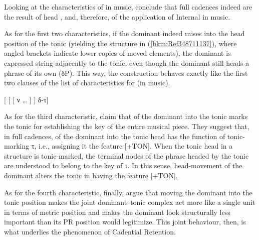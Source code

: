 \documentclass[output=paper]{langsci/langscibook}
\begin{document}
Looking at the characteristics of  in music,
\citeauthor{KatzPes2011} conclude that full cadences indeed are the result of
head , and, therefore, of the application of Internal  in
music.

As for the first two characteristics, if the dominant indeed raises into the
head position of the tonic (yielding the structure in (\ref{bkm:Ref348711137}),
where angled brackets indicate lower copies of moved elements), the dominant is
expressed string-adjacently to the tonic, even though the dominant still heads
a phrase of its own (δP). This way, the construction behaves exactly like the
first two clauses of the list of characteristics for  (in music).

\ea\label{bkm:Ref348711137}
    {}[ [ [ ν \dots{} ]  ] δ-τ]
\z

As for the third characteristic, \citeauthor{KatzPes2011} claim that 
of the dominant into the tonic marks the tonic for establishing the key of the
entire musical piece. They suggest that, in full cadences,  of the
dominant into the tonic head has the function of tonic-marking τ, i.e.,
assigning it the feature [+TON]. When the tonic head in a structure is
tonic-marked, the terminal nodes of the phrase headed by the tonic are
understood to belong to the key of τ. In this sense, head-movement of the
dominant alters the tonic in having the feature [+TON].

As for the fourth characteristic, finally, \citeauthor{KatzPes2011} argue that
moving the dominant into the tonic position makes the joint dominant–tonic
complex act more like a single unit in terms of metric position and makes the
dominant look structurally less important than its \gls{PR} position would
legitimize. This joint behaviour, then, is what underlies the phenomenon of
Cadential Retention.
\end{document}
